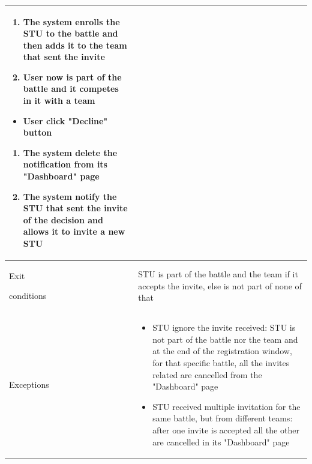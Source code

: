 \begin{center}
\begin{tabular}{| m{2cm} | m{10cm}|}
\begin{enumerate}
\begin{enumerate}
                      \item The system enrolls the STU to the battle and then adds it to the team that sent the invite
                      \item User now is part of the battle and it competes in it with a team
                  \end{enumerate}
                                          \begin{itemize}
                      \item User click "Decline" button
                  \end{itemize}
                                          \begin{enumerate}
                      \item The system delete the notification from its "Dashboard" page
                      \item The system notify the STU that sent the invite of the decision and allows it to invite a new STU
                  \end{enumerate}
                                \end{enumerate}                                                                                                      \\ \hline
        Exit \par conditions  & STU is part of the battle and the team if it accepts the invite, else is not part of none of that                                                                                                                    \\ \hline
        Exceptions            & \begin{itemize}
                                    \item STU ignore the invite received: STU is not part of the battle nor the team and at the end of the registration window, for that specific battle, all the invites related are cancelled from the "Dashboard" page
                                    \item STU received multiple invitation for the same battle, but from different teams: after one invite is accepted all the other are cancelled in its "Dashboard" page
                                \end{itemize} \\ \hline
    \end{tabular}
\end{center}

